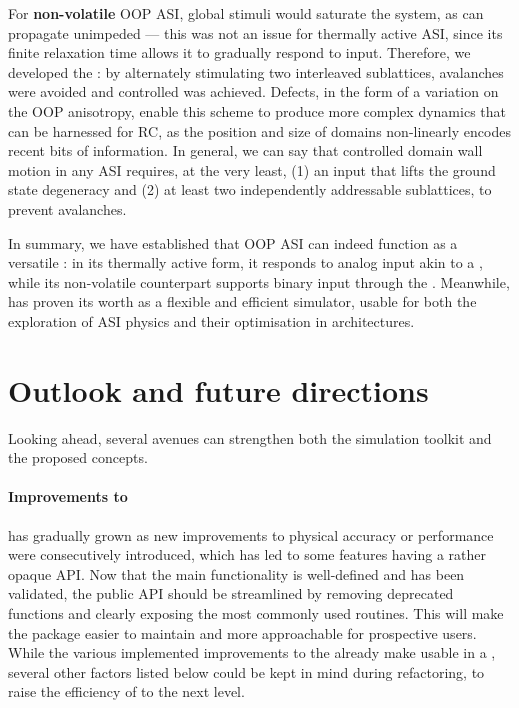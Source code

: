 For \textbf{non-volatile} OOP ASI, global stimuli would saturate the system, as  can propagate unimpeded --- this was not an issue for thermally active ASI, since its finite relaxation time allows it to gradually respond to input.
Therefore, we developed the : by alternately stimulating two interleaved sublattices, avalanches were avoided and controlled  was achieved.
Defects, in the form of a variation on the OOP anisotropy, enable this scheme to produce more complex dynamics that can be harnessed for RC, as the position and size of domains non-linearly encodes recent bits of information.
In general, we can say that controlled domain wall motion in any ASI requires, at the very least, (1) an input that lifts the ground state degeneracy and (2) at least two independently addressable sublattices, to prevent avalanches. \\\par

In summary, we have established that OOP ASI can indeed function as a versatile : in its thermally active form, it responds to analog input akin to a , while its non-volatile counterpart supports binary input through the .
Meanwhile, \hotspice has proven its worth as a flexible and efficient simulator, usable for both the exploration of ASI physics and their optimisation in  architectures.

\newpage
\section{Outlook and future directions}
Looking ahead, several avenues can strengthen both the \hotspice simulation toolkit and the proposed  concepts.

\paragraph{Improvements to \hotspice}
\hotspice has gradually grown as new improvements to physical accuracy or performance were consecutively introduced, which has led to some features having a rather opaque API.
Now that the main functionality is well-defined and has been validated, the public API should be streamlined by removing deprecated functions and clearly exposing the most commonly used routines. %
This will make the package easier to maintain and more approachable for prospective users.
While the various implemented improvements to the  already make \hotspice usable in a , several other factors listed below could be kept in mind during refactoring, to raise the efficiency of \hotspice to the next level. \\\par

